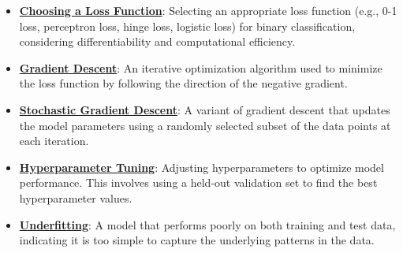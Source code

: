 \documentclass{article}%
\begin{document}
\begin{itemize}[leftmargin=*]
\item \href{https://purdue.brightspace.com/d2l/common/assets/pdfjs-d2l-dist/1.0.14-legacy/web/viewer.html?file=%2Fcontent%2Fenforced%2F1095467-wl.202510.CS.24300.001%2F05L2-ML Basics.pdf%3Fou%3D1095467&lang=en-us&container=d2l-fileviewer-rendered-pdf&fullscreen=d2l-fileviewer-rendered-pdf-dialog&height=667#page=25}{\textbf{Choosing a Loss Function}}: Selecting an appropriate loss function (e.g., 0-1 loss, perceptron loss, hinge loss, logistic loss) for binary classification, considering differentiability and computational efficiency.%
\item \href{https://purdue.brightspace.com/d2l/common/assets/pdfjs-d2l-dist/1.0.14-legacy/web/viewer.html?file=%2Fcontent%2Fenforced%2F1095467-wl.202510.CS.24300.001%2F05L2-ML Basics.pdf%3Fou%3D1095467&lang=en-us&container=d2l-fileviewer-rendered-pdf&fullscreen=d2l-fileviewer-rendered-pdf-dialog&height=667#page=28}{\textbf{Gradient Descent}}: An iterative optimization algorithm used to minimize the loss function by following the direction of the negative gradient.%
\item \href{https://purdue.brightspace.com/d2l/common/assets/pdfjs-d2l-dist/1.0.14-legacy/web/viewer.html?file=%2Fcontent%2Fenforced%2F1095467-wl.202510.CS.24300.001%2F05L2-ML Basics.pdf%3Fou%3D1095467&lang=en-us&container=d2l-fileviewer-rendered-pdf&fullscreen=d2l-fileviewer-rendered-pdf-dialog&height=667#page=29}{\textbf{Stochastic Gradient Descent}}: A variant of gradient descent that updates the model parameters using a randomly selected subset of the data points at each iteration.%
\item \href{https://purdue.brightspace.com/d2l/common/assets/pdfjs-d2l-dist/1.0.14-legacy/web/viewer.html?file=%2Fcontent%2Fenforced%2F1095467-wl.202510.CS.24300.001%2F10L1-CrossValidation.pdf%3Fou%3D1095467&lang=en-us&container=d2l-fileviewer-rendered-pdf&fullscreen=d2l-fileviewer-rendered-pdf-dialog&height=667#page=14}{\textbf{Hyperparameter Tuning}}: Adjusting hyperparameters to optimize model performance. This involves using a held-out validation set to find the best hyperparameter values.%
\item \href{https://purdue.brightspace.com/d2l/common/assets/pdfjs-d2l-dist/1.0.14-legacy/web/viewer.html?file=%2Fcontent%2Fenforced%2F1095467-wl.202510.CS.24300.001%2F10L1-CrossValidation.pdf%3Fou%3D1095467&lang=en-us&container=d2l-fileviewer-rendered-pdf&fullscreen=d2l-fileviewer-rendered-pdf-dialog&height=667#page=21}{\textbf{Underfitting}}: A model that performs poorly on both training and test data, indicating it is too simple to capture the underlying patterns in the data.%

\end{itemize}
\end{document}
